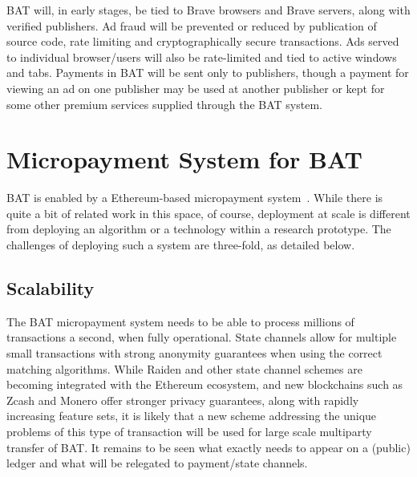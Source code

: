 \documentclass[twocolumn,9pt]{article}
\newcommand{\bat}{\textsf{BAT}\xspace}
\begin{document}

\noindent
\bat will, in early stages, be tied to Brave browsers and Brave servers, along with verified publishers. Ad fraud will be prevented or reduced by publication of source code, rate limiting and cryptographically secure transactions. Ads served to individual browser/users will also be rate-limited and tied to active windows and tabs. Payments in \bat will be sent only to publishers, though a payment for viewing an ad on one publisher may be used at another publisher or kept for some other premium services supplied through the \bat system.

\section{Micropayment System for \bat}
\label{sec-4-3}

\newcommand{\point}[1]{\smallskip\par\noindent\textbf{#1.}~}

\bat is enabled by a Ethereum-based micropayment system~\cite{bolt,decentralized-anonymous,McCorry2016,Miller2017}. While there is quite a bit of related work in this space, of course, deployment at scale is different from deploying an algorithm or a technology within a research prototype.
The challenges of deploying such a system are three-fold, as detailed below. 

\subsection{Scalability} 
The \bat micropayment system needs to be able to process millions of transactions a second, when fully operational. State channels allow for multiple small transactions with strong anonymity guarantees when using the correct matching algorithms. While Raiden and other state channel schemes are becoming integrated with the Ethereum ecosystem, and new blockchains such as Zcash and Monero offer stronger privacy guarantees, along with rapidly increasing feature sets, it is likely that a new scheme addressing the unique problems of this type of transaction will be used for large scale multiparty transfer of \bat.
It remains to be seen what exactly needs to appear on a (public) ledger and what will be relegated to payment/state channels. 
\end{document}
